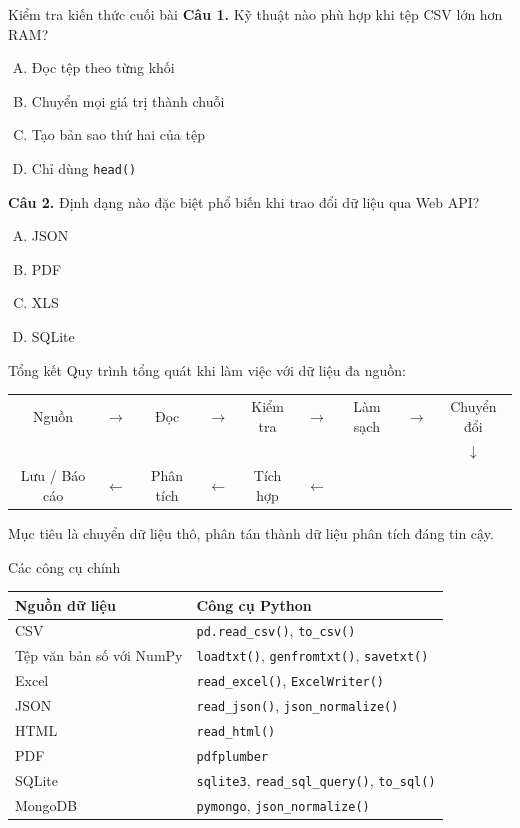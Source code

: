 \documentclass[aspectratio=169,11pt]{beamer}
\newcommand{\code}[1]{\texttt{#1}}
\newcommand{\smallgap}{\vspace{0.4em}}
\begin{document}
\begin{frame}{Kiểm tra kiến thức cuối bài}
\textbf{Câu 1.} Kỹ thuật nào phù hợp khi tệp CSV lớn hơn RAM?
\begin{enumerate}[A.]
  \item Đọc tệp theo từng khối
  \item Chuyển mọi giá trị thành chuỗi
  \item Tạo bản sao thứ hai của tệp
  \item Chỉ dùng \code{head()}
\end{enumerate}

\smallgap
\textbf{Câu 2.} Định dạng nào đặc biệt phổ biến khi trao đổi dữ liệu qua Web API?
\begin{enumerate}[A.]
  \item JSON
  \item PDF
  \item XLS
  \item SQLite
\end{enumerate}
\end{frame}

\begin{frame}{Tổng kết}
Quy trình tổng quát khi làm việc với dữ liệu đa nguồn:
\begin{center}
\small
\begin{tabular}{ccccccccc}
Nguồn & $\rightarrow$ & Đọc & $\rightarrow$ & Kiểm tra & $\rightarrow$ & Làm sạch & $\rightarrow$ & Chuyển đổi \\[0.4em]
 & & & & & & & & $\downarrow$ \\[0.4em]
Lưu / Báo cáo & $\leftarrow$ & Phân tích & $\leftarrow$ & Tích hợp & $\leftarrow$ & & &
\end{tabular}
\end{center}
\smallgap
Mục tiêu là chuyển dữ liệu thô, phân tán thành dữ liệu phân tích đáng tin cậy.
\end{frame}

\begin{frame}{Các công cụ chính}
\begin{tabularx}{\textwidth}{lX}
\toprule
\textbf{Nguồn dữ liệu} & \textbf{Công cụ Python} \\
\midrule
CSV & \code{pd.read\_csv()}, \code{to\_csv()} \\
Tệp văn bản số với NumPy & \code{loadtxt()}, \code{genfromtxt()}, \code{savetxt()} \\
Excel & \code{read\_excel()}, \code{ExcelWriter()} \\
JSON & \code{read\_json()}, \code{json\_normalize()} \\
HTML & \code{read\_html()} \\
PDF & \code{pdfplumber} \\
SQLite & \code{sqlite3}, \code{read\_sql\_query()}, \code{to\_sql()} \\
MongoDB & \code{pymongo}, \code{json\_normalize()} \\
\bottomrule
\end{tabularx}
\end{frame}
\end{document}
